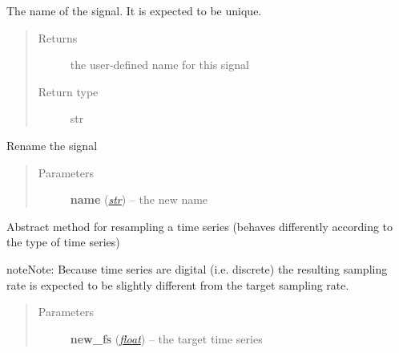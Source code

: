 \documentclass[letterpaper,10pt,english]{sphinxmanual}
\begin{document}
\begin{fulllineitems}

\begin{fulllineitems}
\label{pyrem.time_series:pyrem.time_series.BiologicalTimeSeries.name}
The name of the signal. It is expected to be unique.
\begin{quote}\begin{description}
\item[{Returns}] \leavevmode
the user-defined name for this signal

\item[{Return type}] \leavevmode
str

\end{description}\end{quote}

\end{fulllineitems}


\begin{fulllineitems}
\label{pyrem.time_series:pyrem.time_series.BiologicalTimeSeries.rename}
Rename the signal
\begin{quote}\begin{description}
\item[{Parameters}] \leavevmode
\textbf{name} (\href{http://docs.python.org/2.7/library/functions.html\#str}{\emph{str}}) -- the new name

\end{description}\end{quote}

\end{fulllineitems}


\begin{fulllineitems}
\label{pyrem.time_series:pyrem.time_series.BiologicalTimeSeries.resample}
Abstract method for resampling a time series (behaves differently according to the type of time series)

\begin{notice}{note}{Note:}
Because time series are digital (i.e. discrete) the resulting sampling rate is expected to be
slightly different from the target sampling rate.
\end{notice}
\begin{quote}\begin{description}
\item[{Parameters}] \leavevmode
\textbf{new\_fs} (\href{http://docs.python.org/2.7/library/functions.html\#float}{\emph{float}}) -- the target time series


\end{description}
\end{quote}
\end{fulllineitems}
\end{fulllineitems}
\end{document}
